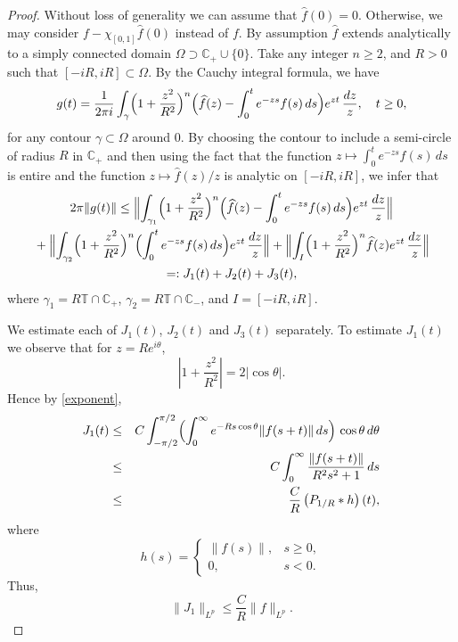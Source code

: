 \documentclass[11pt]{amsart}
\theoremstyle{definition}
\theoremstyle{remark}
\numberwithin{equation}{section}
\begin{document}
\begin{proof}
Without loss of generality we can assume that $\widehat f(0)=0$. Otherwise, we may consider $f -\chi_{[0,1]}\widehat f(0)$ instead of $f$.
By assumption $\widehat f$ extends analytically to a simply connected domain $\Omega \supset {{\mathbb C}}_+ \cup \{0\}$.  Take any integer $n\ge 2$, and $R>0$ such that $[-iR,iR] \subset \Omega$.  By the Cauchy integral formula, we have
\begin{equation} \label{Ciform}
g(t)=
\frac 1{2\pi i}\int_\gamma
\Bigl(1+\frac {z^2}{R^2}\Bigr)^n \Bigl(\widehat f(z) -\int_{0}^{t}
e^{-zs}f(s) \, ds\Bigr)e^{zt}\,\frac{dz}{z}, \quad t \ge 0,
\end{equation}
for any contour $\gamma\subset\Omega$ around $0$.
By choosing the contour to include a semi-circle of radius $R$ in ${{\mathbb C}}_+$ and then using the fact that the function $z\mapsto \int_{0}^{t}
e^{-zs}f(s)\, ds$ is entire and the function $z \mapsto \widehat f(z)/ z$ is analytic on $[-iR,iR]$, we infer that
\begin{multline}
2\pi \|g(t)\| \le
\Bigl\|\int_{\gamma_1} \Bigl(1+\frac {z^2}{R^2}\Bigr)^n \Bigl(\widehat
f(z) -\int_{0}^{t} e^{-zs}f(s) \, ds\Bigr)
e^{zt}\,\frac{dz}{z}\Bigr\|\\
 \null + \Bigl\|\int_{\gamma_2} \Bigl(1+\frac {z^2}{R^2}\Bigr)^n
\Bigl(\int_{0}^{t} e^{-zs}f(s) \, ds\Bigr)
e^{zt}\,\frac{dz}{z}\Bigr\|+ \Bigl\|\int_{I} \Bigl(1+\frac
{z^2}{R^2}\Bigr)^n \widehat f(z)
e^{zt}\,\frac{dz}{z}\Bigr\| \\
=: J_1(t)+J_2(t)+J_3(t), \label{sumj}
\end{multline}
where  $\gamma_1=R\mathbb T\cap \mathbb C_+$, $\gamma_2=R\mathbb T\cap \mathbb C_-$, and $I=[-iR,iR]$.

We estimate each of $J_1(t)$, $J_2(t)$ and $J_3(t)$ separately.
To estimate $J_1(t)$ we observe that for $z = Re^{i\theta}$,
$$
\left| 1 + \frac{z^2}{R^2} \right| = {2|\cos\theta|}.
$$
Hence by \eqref{exponent},
\begin{eqnarray} \label{j1est}
J_1(t) &\le&
C \int_{-\pi/2}^{\pi/2} \Bigl(\int_{0}^\infty
e^{-Rs\cos\theta}\|f(s+t)\|\,ds\Bigr)\, \cos\theta\,d\theta
\\
&\le& C \int_{0}^\infty \frac{ \|f(s+t)\|}{R^2s^2+1} \,ds \nonumber
\\
&\le&  \frac{C}{R} \left(P_{1/R}*h \right)(t),  \nonumber
\end{eqnarray}
where
\[
h(s)=\begin{cases} \|f(s)\|, &s\ge0, \\ 0, &s<0. \end{cases}
\]
Thus,
\begin{equation}\label{j1int}
\| J_1\|_{L^p}  \le \frac{C}{R}  \|f\|_{L^p}.
\end{equation}


\end{proof}
\end{document}
